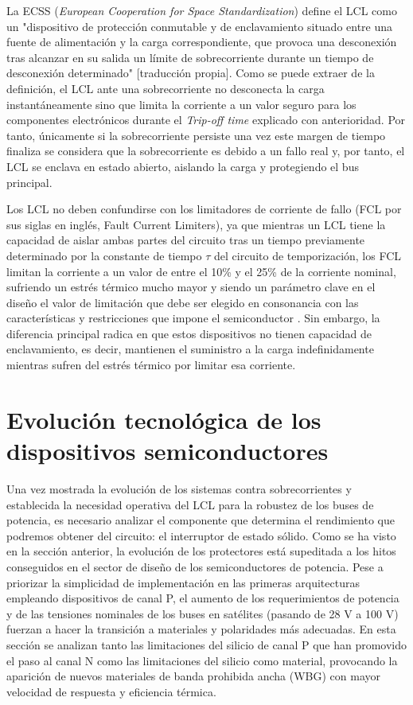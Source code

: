 \documentclass[12pt]{report} %
\begin{document}
La ECSS (\textit{European Cooperation for Space Standardization}) define el LCL como un "dispositivo de protección conmutable y de enclavamiento situado entre una fuente de alimentación y la carga correspondiente, que provoca una desconexión tras alcanzar en su salida un límite de sobrecorriente durante un tiempo de desconexión determinado" [traducción propia]\cite{european_cooperation_for_space_standardization_ecss_latching_nodate}. Como se puede extraer de la definición, el LCL ante una sobrecorriente no desconecta la carga instantáneamente sino que limita la corriente a un valor seguro para los componentes electrónicos durante el \textit{Trip-off time} explicado con anterioridad. Por tanto, únicamente si la sobrecorriente persiste una vez este margen de tiempo finaliza se considera que la sobrecorriente es debido a un fallo real y, por tanto, el LCL se enclava en estado abierto, aislando la carga y protegiendo el bus principal. 

Los LCL no deben confundirse con los limitadores de corriente de fallo (FCL por sus siglas en inglés, Fault Current Limiters), ya que mientras un LCL tiene la capacidad de aislar ambas partes del circuito tras un tiempo previamente determinado por la constante de tiempo ${\tau}$ del circuito de temporización, los FCL limitan la corriente a un valor de entre el 10\% y el 25\% de la corriente nominal, sufriendo un estrés térmico mucho mayor y siendo un parámetro clave en el diseño el valor de limitación que debe ser elegido en consonancia con las características y restricciones que impone el semiconductor \cite{marroqui_sempere_david_diseno_nodate}. Sin embargo, la diferencia principal radica en que estos dispositivos no tienen capacidad de enclavamiento, es decir, mantienen el suministro a la carga indefinidamente mientras sufren del estrés térmico por limitar esa corriente.

\section{Evolución tecnológica de los dispositivos semiconductores}

Una vez mostrada la evolución de los sistemas contra sobrecorrientes y establecida la necesidad operativa del LCL para la robustez de los buses de potencia, es necesario analizar el componente que determina el rendimiento que podremos obtener del circuito: el interruptor de estado sólido. Como se ha visto en la sección anterior, la evolución de los protectores está supeditada a los hitos conseguidos en el sector de diseño de los semiconductores de potencia. 
Pese a priorizar la simplicidad de implementación en las primeras arquitecturas empleando dispositivos de canal P, el aumento de los requerimientos de potencia y de las tensiones nominales de los buses en satélites (pasando de 28 V a 100 V) fuerzan a hacer la transición a materiales y polaridades más adecuadas.
En esta sección se analizan tanto las limitaciones del silicio de canal P que han promovido el paso al canal N como las limitaciones del silicio como material, provocando la aparición de nuevos materiales de banda prohibida ancha (WBG) con mayor velocidad de respuesta y eficiencia térmica.
\end{document}
